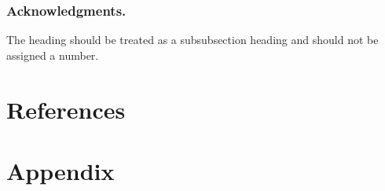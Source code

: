 \documentclass[runningheads,a4paper]{llncs}
\begin{document}
\subsubsection*{Acknowledgments.} The heading should be treated as a
subsubsection heading and should not be assigned a number.

\section{References}\label{references}
%



\section*{Appendix} 
\end{document}
